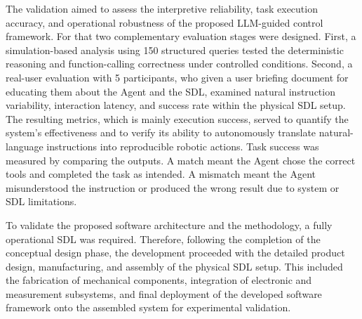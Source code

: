 The validation aimed to assess the interpretive reliability, task execution accuracy, and operational robustness of the proposed LLM-guided control framework. For that two complementary evaluation stages were designed. First, a simulation-based analysis using 150 structured queries tested the deterministic reasoning and function-calling correctness under controlled conditions. Second, a real-user evaluation with 5 participants, who given a user briefing document for educating them about the Agent and the SDL, examined natural instruction variability, interaction latency, and success rate within the physical SDL setup. The resulting metrics, which is mainly execution success, served to quantify the system’s effectiveness and to verify its ability to autonomously translate natural-language instructions into reproducible robotic actions. Task success was measured by comparing the outputs. A match meant the Agent chose the correct tools and completed the task as intended. A mismatch meant the Agent misunderstood the instruction or produced the wrong result due to system or SDL limitations.


To validate the proposed software architecture and the methodology, a fully operational SDL was required. Therefore, following the completion of the conceptual design phase, the development proceeded with the detailed product design, manufacturing, and assembly of the physical SDL setup. This included the fabrication of mechanical components, integration of electronic and measurement subsystems, and final deployment of the developed software framework onto the assembled system for experimental validation.


